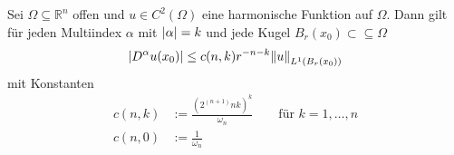 \begin{satz}
	Sei $\Omega \subseteq \mathbb{R}^n$ offen und $u \in C^2(\Omega)$ eine harmonische Funktion auf $\Omega$. Dann gilt für jeden Multiindex $\alpha$ mit $ \lvert\alpha\rvert=k$ und jede Kugel $B_r(x_0) \subset \subseteq \Omega$
	\begin{equation}
		\abs{D^{\alpha}u(x_0)} \leq c(n,k)r^{-n-k} \norm{u}_{L^1(B_r(x_0))}
	\end{equation}
	mit Konstanten 
	\begin{align}
		c(n,k) &:= \frac{\left( 2^{(n+1)}nk \right)^k}{\omega_n} \qquad \text{für }k=1,\dots,n \\
		c(n,0) &:= \frac{1}{\omega_n}
	\end{align}
\end{satz}

